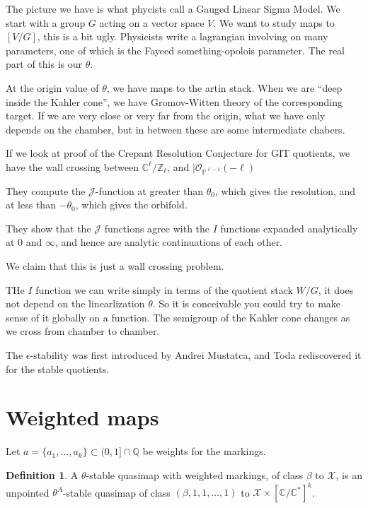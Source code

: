 \documentclass{amsart}
\theoremstyle{definition}
\newtheorem{definition}[dummy]{Definition}
\newcommand{\Z}{\mathbb{Z}}
\newcommand{\OO}{\mathcal{O}}
\newcommand{\proj}{\mathbb{P}}
\newcommand{\J}{\mathcal{J}}
\newcommand{\Q}{\mathbb{Q}}
\newcommand{\C}{\mathbb{C}}
\begin{document}

The picture we have is what phycists call a Gauged Linear Sigma Model.  We start with a group $G$ acting on a vector space $V$.  We want to study maps to $[V/G]$, this is a bit ugly.
Physicists write a lagrangian involving on many parameters, one of which is the Fayeed something-opolois parameter.  The real part of this is our $\theta$.

At the origin value of $\theta$, we have maps to the artin stack.  When we are ``deep inside the Kahler cone'', we have Gromov-Witten theory of the corresponding target.  If we are very close or very far from the origin, what we have only depends on the chamber, but in between these are some intermediate chabers.

If we look at proof of the Crepant Resolution Conjecture for GIT quotients, we have the wall crossing between $\C^\ell/\Z_\ell$, and $|\OO_{\proj^{\ell-1}}(-\ell)$

They compute the $\J$-function at greater than $\theta_0$, which gives the resolution, and at less than $-\theta_0$, which gives the orbifold.

They show that the $\J$ functions agree with the $I$ functions expanded analytically at $0$ and $\infty$, and hence are analytic continuations of each other.

We claim that this is just a wall crossing problem.  

THe $I$ function we can write simply in terms of the quotient stack $W/G$, it does not depend on the linearlization $\theta$.  So it is conceivable you could try to make sense of it globally on a function.  The semigroup of the Kahler cone changes as we cross from chamber to chamber.

The $\epsilon$-stability was first introduced by Andrei Mustatca, and Toda rediscovered it for the stable quotients.  

\section{Weighted maps}
Let $a=\{a_1,\dots,a_k\}\subset (0,1]\cap \Q$ be weights for the markings.

\begin{definition}
A $\theta$-stable quasimap with weighted markings, of class $\beta$ to $\mathcal{X}$, is an unpointed $\theta^A$-stable quasimap of class $(\beta,1,1,\dots,1)$ to $\mathcal{X}\times[\C/\C^*]^k$.
\end{definition}
 
\end{document}
